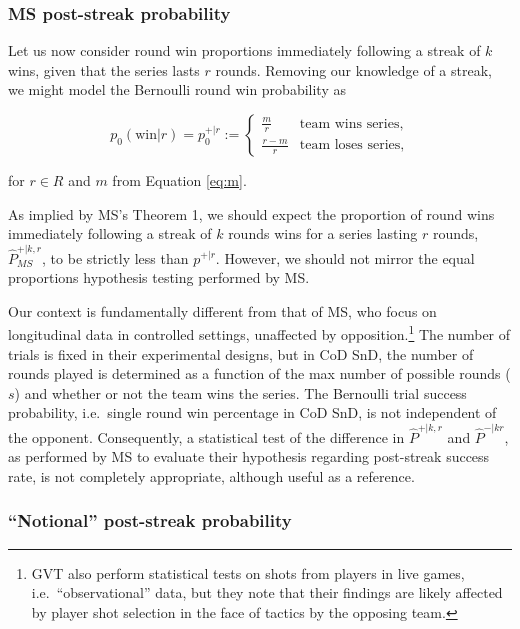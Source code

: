 \documentclass{article}
\begin{document}
\hypertarget{ms-post-streak-probability}{%
\subsubsection{MS post-streak
probability}\label{ms-post-streak-probability}}

Let us now consider round win proportions immediately following a streak
of \(k\) wins, given that the series lasts \(r\) rounds. Removing our
knowledge of a streak, we might model the Bernoulli round win
probability as

\begin{equation}\label{eq:pwr}
p_0(\text{win} | r) = p^{+|r}_0 := \begin{cases} 
  \frac{m}{r} & \text{team wins series}, \\ 
  \frac{r - m}{r} & \text{team loses series},
\end{cases}
\end{equation}

for \(r \in R\) and \(m\) from Equation \ref{eq:m}.

As implied by MS's Theorem 1, we should expect the proportion of round
wins immediately following a streak of \(k\) rounds wins for a series
lasting \(r\) rounds, \(\hat{P}^{+|k,r}_{MS}\), to be strictly less than
\(p^{+|r}\). However, we should not mirror the equal proportions
hypothesis testing performed by MS.

Our context is fundamentally different from that of MS, who focus on
longitudinal data in controlled settings, unaffected by
opposition.\footnote{GVT also perform statistical tests on shots from
  players in live games, i.e.~``observational'' data, but they note that
  their findings are likely affected by player shot selection in the
  face of tactics by the opposing team.} The number of trials is fixed
in their experimental designs, but in CoD SnD, the number of rounds
played is determined as a function of the max number of possible rounds
(\(s\)) and whether or not the team wins the series. The Bernoulli trial
success probability, i.e.~single round win percentage in CoD SnD, is not
independent of the opponent. Consequently, a statistical test of the
difference in \(\hat{P}^{+|k,r}\) and \(\hat{P}^{-|kr}\), as performed
by MS to evaluate their hypothesis regarding post-streak success rate,
is not completely appropriate, although useful as a reference.

\hypertarget{notional-post-streak-probability}{%
\subsubsection{``Notional'' post-streak
probability}\label{notional-post-streak-probability}}
\end{document}
